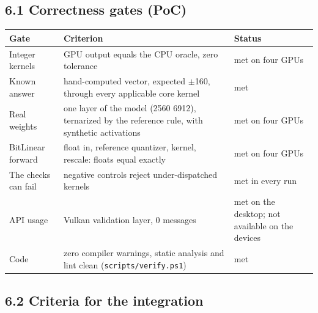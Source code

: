 \documentclass[
  10pt,
]{article}
\newcounter{none} %
\begin{document}
\subsection{6.1 Correctness gates (PoC)}\label{correctness-gates-poc}

{\def\LTcaptype{none} %
\begin{longtable}[]{@{}
  >{\raggedright\arraybackslash}p{}
  >{\raggedright\arraybackslash}p{}
  >{\raggedright\arraybackslash}p{}@{}}
\toprule\noalign{}
\begin{minipage}[b]{\linewidth}\raggedright%
Gate
\end{minipage} & \begin{minipage}[b]{\linewidth}\raggedright%
Criterion
\end{minipage} & \begin{minipage}[b]{\linewidth}\raggedright%
Status
\end{minipage} \\
\midrule\noalign{}
\endhead%
\bottomrule\noalign{}
\endlastfoot%
Integer kernels & GPU output equals the CPU oracle, zero tolerance & met
on four GPUs \\
Known answer & hand-computed vector, expected $\pm$160, through every
applicable core kernel & met \\
Real weights & one layer of the model (2560 \texttimes{} 6912), ternarized by the
reference rule, with synthetic activations & met on four GPUs \\
BitLinear forward & float in, reference quantizer, kernel, rescale:
floats equal exactly & met on four GPUs \\
The checks can fail & negative controls reject under-dispatched kernels
& met in every run \\
API usage & Vulkan validation layer, 0 messages & met on the desktop;
not available on the devices \\
Code & zero compiler warnings, static analysis and lint clean
(\texttt{scripts/verify.ps1}) & met \\
\end{longtable}
}

\subsection{6.2 Criteria for the
integration}\label{criteria-for-the-integration}
\end{document}
